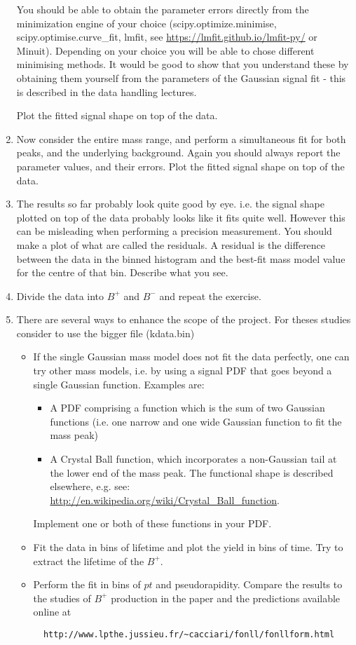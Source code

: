 \begin{enumerate}
You should be able to obtain the parameter errors directly from the minimization engine of your choice (scipy.optimize.minimise, scipy.optimise.curve\_fit, lmfit, see \url{https://lmfit.github.io/lmfit-py/} or Minuit). Depending on your choice you will be able to chose different minimising methods.
It would be good to show that you understand these by obtaining them yourself from the parameters of the Gaussian signal fit - this is described in the data handling lectures.

Plot the fitted signal shape on top of the data.

\item Now consider the entire mass range, and perform a simultaneous fit for both
peaks, and the underlying background. Again you should always report the parameter
values, and their errors. Plot the fitted signal shape on top of the data.
\item The results so far probably look quite good by eye. i.e. the signal shape plotted on
top of the data probably looks like it fits quite well. However this can be misleading
when performing a precision measurement. You should make a plot of what are called
the residuals. A residual is the difference between the data in the binned histogram
and the best-fit mass model value for the centre of that bin. Describe what you see.
\item Divide the data into $B^+$ and $B^-$ and repeat the exercise.

\item There are several ways to enhance the scope of the project. For theses studies consider to use the bigger file (kdata.bin)
  \begin{itemize}
\item If the single Gaussian mass model does not fit the data perfectly, one can try other mass models, i.e. by using a signal PDF that goes beyond a single Gaussian function.  Examples are:
\begin{itemize}
\item A PDF comprising a function which is the sum of two Gaussian functions (i.e. one narrow and one wide Gaussian function to fit the mass peak)
\item A Crystal Ball function, which incorporates a non-Gaussian tail at the lower end of the mass peak. The functional shape is described elsewhere, e.g. see: \url{http://en.wikipedia.org/wiki/Crystal_Ball_function}. 
\end{itemize}
Implement one or both of these functions in your PDF.
\item Fit the data in bins of lifetime and plot the yield in bins of time. Try to extract the lifetime of the $B^+$.
\item Perform the fit in bins of $pt$ and pseudorapidity. Compare the results to the studies of $B^+$ production in the paper and the predictions available online at
\begin{verbatim}
  http://www.lpthe.jussieu.fr/~cacciari/fonll/fonllform.html 
\end{verbatim} 

\end{itemize}
\end{enumerate}

